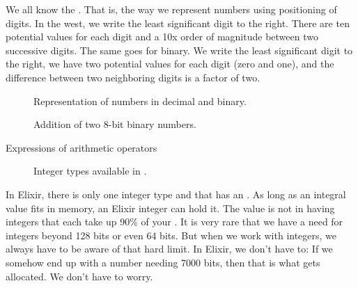 We all know the . That is, the way we represent numbers using  positioning of digits. In the west, we write the least significant digit to the right. There are ten potential values for each digit and a 10x order of magnitude between two successive digits. The same goes for binary. We write the least significant digit to the right, we have two potential values for each digit (zero and one), and the difference between two neighboring digits is a factor of two.

\begin{figure}[tbp]
  
  \caption{Representation of numbers in decimal and binary.}
  \label{fig:prim:int:repr:base}
\end{figure}



\begin{figure}[tbp]
  
  \caption{Addition of two 8-bit binary numbers.}
  \label{fig:prim:int:binary:add}
\end{figure}


\csharpsubsection{\csharp}

\begin{syntaxfloat}
  
  \caption{Expressions of arithmetic operators}
  \label{syntax:prim:arithmetic:ops}
\end{syntaxfloat}


\begin{figure}[tbp]
  
  \caption{Integer types available in \csharp.}
  \label{fig:prim:int:csharp:types}
\end{figure}



In Elixir, there is only one integer type and that has an . As long as an integral value fits in memory, an Elixir integer can hold it. The value is not in having integers that each take up 90\% of your . It is very rare that we have a need for integers beyond 128 bits or even 64 bits. But when we work with  integers, we always have to be aware of that hard limit. In Elixir, we don't have to: If we somehow end up with a number needing 7000 bits, then that is what gets allocated. We don't have to worry.

